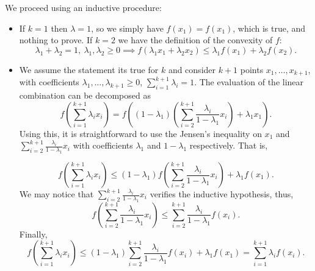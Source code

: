 \documentclass[12pt]{scrartcl}
\begin{document}
We proceed using an inductive procedure:

\begin{itemize}
    \item If $k=1$ then $\lambda = 1$, so we simply have $f(x_1) = f(x_1)$, which is true, and
    nothing to prove. If $k=2$ we have the definition of the convexity of $f$:
    \begin{equation*}
        \lambda_1 + \lambda_2 = 1, \ \lambda_1, \lambda_2 \geq 0 \implies f(\lambda_1 x_1 + \lambda_2 x_2) \leq \lambda_1 f(x_1) + \lambda_2 f(x_2).
    \end{equation*}
    \item We assume the statement its true for $k$ and consider $k+1$ points $x_1, \dots, x_{k+1}$, with coefficients $\lambda_1, \dots, \lambda_{k+1} \geq 0$, $\sum_{i=1}^{k+1} \lambda_i = 1$. The evaluation of the linear combination can be decomposed as
    \begin{equation*}
        f\left( \sum_{i=1}^{k+1} \lambda_i  x_i \right) = f\left( (1-\lambda_1) \left(\sum_{i=2}^{k+1} \frac{\lambda_i}{1-\lambda_1} x_i\right) + \lambda_1 x_1\right).
    \end{equation*}
    Using this, it is straightforward to use the Jensen's inequality on $x_1$ and $\sum_{i=2}^{k+1} \frac{\lambda_i}{1-\lambda_1} x_i $ with coefficients $\lambda_1$ and $1-\lambda_1$  respectively.  That is,

    \begin{equation*}
        f\left( \sum_{i=1}^{k+1} \lambda_i  x_i \right) \leq (1 - \lambda_1) f \left( \sum_{i=2}^{k+1} \frac{\lambda_i}{1-\lambda_1} x_i \right) + \lambda_1 f(x_1).
    \end{equation*}
    We may notice that $\sum_{i=2}^{k+1} \frac{\lambda_i}{1-\lambda_1} x_i$ verifies the inductive hypothesis, thus,
    \begin{equation*}
        f \left( \sum_{i=2}^{k+1} \frac{\lambda_i}{1-\lambda_1} x_i \right) \leq \sum_{i=2}^{k+1} \frac{\lambda_i}{1-\lambda_1} f(x_i).
    \end{equation*}
    Finally,
    \begin{equation*}
        f\left(\sum_{i=1}^{k+1} \lambda_i x_i \right) \leq (1-\lambda_1) \sum_{i = 2}^{k+1} \frac{\lambda_i}{1-\lambda_1}f(x_i) + \lambda_1 f(x_1) = \sum_{i=1}^{k+1} \lambda_i f(x_i).
    \end{equation*}
\end{itemize}


 

\end{document}
